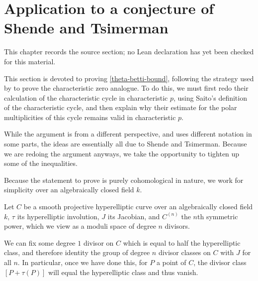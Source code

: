 \chapter{Application to a conjecture of Shende and Tsimerman}
\label{bounds-stalks-perverse-sheaves-characteristic-p-shende-chapter-05}

\begin{remark}
\label{bounds-stalks-perverse-sheaves-characteristic-p-shende-chapter-05-source}
This chapter records the source section; no Lean declaration has yet been checked for this material.
\notready
\end{remark}

This section is devoted to proving \ref{theta-betti-bound}, following the strategy used by \citet{TS} to prove the characteristic zero analogue. To do this, we must first redo their calculation of the characteristic cycle in characteristic $p$, using Saito's definition of the characteristic cycle, and then explain why their estimate for the polar multiplicities of this cycle remains valid in characteristic $p$.

While the argument is from a different perspective, and uses different notation in some parts, the ideas are essentially all due to Shende and Tsimerman. Because we are redoing the argument anyways, we take the opportunity to tighten up some of the inequalities.

Because the statement to prove is purely cohomological in nature, we work for simplicity over an algebraically closed field $k$.

 Let $C$ be a smooth projective hyperelliptic curve over an algebraically closed field $k$, $\tau$ its hyperelliptic involution, $J$ its Jacobian, and $C^{(n)}$ the $n$th symmetric power, which we view as a moduli space of degree $n$ divisors.

 We can fix some degree $1$ divisor on $C$ which is equal to half the hyperelliptic class, and therefore identity the group of degree $n$ divisor classes on $C$ with $J$ for all $n$. In particular, once we have done this, for $P$ a point of $C$, the divisor class $[P+ \tau(P)]$ will equal the hyperelliptic class and thus vanish.


